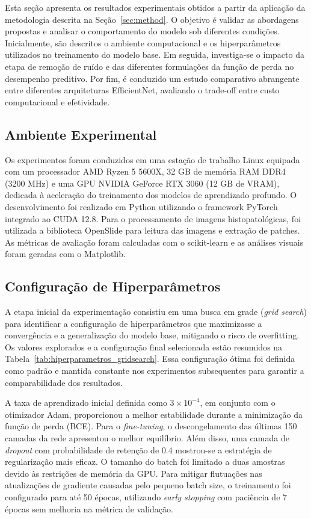 Esta seção apresenta os resultados experimentais obtidos a partir da aplicação da metodologia descrita na Seção~\ref{sec:method}. O objetivo é validar as abordagens propostas e analisar o comportamento do modelo sob diferentes condições. Inicialmente, são descritos o ambiente computacional e os hiperparâmetros utilizados no treinamento do modelo base. Em seguida, investiga-se o impacto da etapa de remoção de ruído e das diferentes formulações da função de perda no desempenho preditivo. Por fim, é conduzido um estudo comparativo abrangente entre diferentes arquiteturas EfficientNet, avaliando o trade-off entre custo computacional e efetividade.

\subsection{Ambiente Experimental}

Os experimentos foram conduzidos em uma estação de trabalho Linux equipada com um processador AMD Ryzen 5 5600X, 32 GB de memória RAM DDR4 (3200 MHz) e uma GPU NVIDIA GeForce RTX 3060 (12 GB de VRAM), dedicada à aceleração do treinamento dos modelos de aprendizado profundo. O desenvolvimento foi realizado em Python utilizando o framework PyTorch integrado ao CUDA 12.8. Para o processamento de imagens histopatológicas, foi utilizada a biblioteca OpenSlide para leitura das imagens e extração de patches. As métricas de avaliação foram calculadas com o scikit-learn e as análises visuais foram geradas com o Matplotlib.

\subsection{Configuração de Hiperparâmetros}

A etapa inicial da experimentação consistiu em uma busca em grade (\textit{grid search}) para identificar a configuração de hiperparâmetros que maximizasse a convergência e a generalização do modelo base, mitigando o risco de overfitting. Os valores explorados e a configuração final selecionada estão resumidos na Tabela~\ref{tab:hiperparametros_gridsearch}. Essa configuração ótima foi definida como padrão e mantida constante nos experimentos subsequentes para garantir a comparabilidade dos resultados.

A taxa de aprendizado inicial definida como $3\times10^{-4}$, em conjunto com o otimizador Adam, proporcionou a melhor estabilidade durante a minimização da função de perda (BCE). Para o \textit{fine-tuning}, o descongelamento das últimas 150 camadas da rede apresentou o melhor equilíbrio. Além disso, uma camada de \textit{dropout} com probabilidade de retenção de 0.4 mostrou-se a estratégia de regularização mais eficaz. O tamanho do batch foi limitado a duas amostras devido às restrições de memória da GPU. Para mitigar flutuações nas atualizações de gradiente causadas pelo pequeno batch size, o treinamento foi configurado para até 50 épocas, utilizando \textit{early stopping} com paciência de 7 épocas sem melhoria na métrica de validação.


